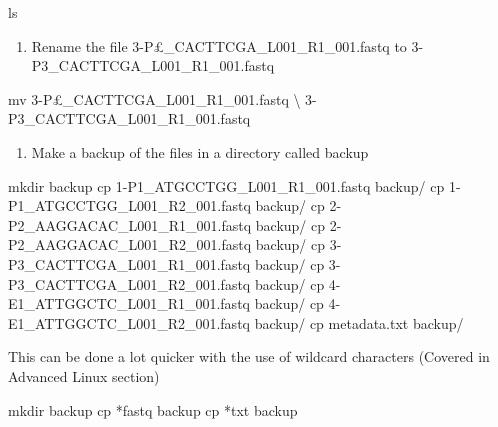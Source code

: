 \documentclass[
  letterpaper,
  DIV=11,
  numbers=noendperiod]{scrreprt}
\newenvironment{Shaded}{\begin{snugshade}}{\end{snugshade}}
\newcommand{\DataTypeTok}[1]{\textcolor[rgb]{0.68,0.00,0.00}{#1}}
\newcommand{\FunctionTok}[1]{\textcolor[rgb]{0.28,0.35,0.67}{#1}}
\newcommand{\NormalTok}[1]{\textcolor[rgb]{0.00,0.23,0.31}{#1}}
\newcommand{\PreprocessorTok}[1]{\textcolor[rgb]{0.68,0.00,0.00}{#1}}
\providecommand{\tightlist}{%
  \setlength{\itemsep}{0pt}\setlength{\parskip}{0pt}}
\begin{document}
\begin{Shaded}
\begin{Highlighting}[]
\FunctionTok{ls}
\end{Highlighting}
\end{Shaded}

\begin{enumerate}
\def\labelenumi{\arabic{enumi}.}
\setcounter{enumi}{1}
\tightlist
\item
  Rename the file 3-P£\_CACTTCGA\_L001\_R1\_001.fastq to
  3-P3\_CACTTCGA\_L001\_R1\_001.fastq
\end{enumerate}

\begin{Shaded}
\begin{Highlighting}[]
\FunctionTok{mv}\NormalTok{ 3{-}P£\_CACTTCGA\_L001\_R1\_001.fastq }\DataTypeTok{\textbackslash{}}
\NormalTok{3{-}P3\_CACTTCGA\_L001\_R1\_001.fastq}
\end{Highlighting}
\end{Shaded}

\begin{enumerate}
\def\labelenumi{\arabic{enumi}.}
\setcounter{enumi}{2}
\tightlist
\item
  Make a backup of the files in a directory called backup
\end{enumerate}

\begin{Shaded}
\begin{Highlighting}[]
\FunctionTok{mkdir}\NormalTok{ backup}
\FunctionTok{cp}\NormalTok{ 1{-}P1\_ATGCCTGG\_L001\_R1\_001.fastq backup/}
\FunctionTok{cp}\NormalTok{ 1{-}P1\_ATGCCTGG\_L001\_R2\_001.fastq backup/}
\FunctionTok{cp}\NormalTok{ 2{-}P2\_AAGGACAC\_L001\_R1\_001.fastq backup/}
\FunctionTok{cp}\NormalTok{ 2{-}P2\_AAGGACAC\_L001\_R2\_001.fastq backup/}
\FunctionTok{cp}\NormalTok{ 3{-}P3\_CACTTCGA\_L001\_R1\_001.fastq backup/}
\FunctionTok{cp}\NormalTok{ 3{-}P3\_CACTTCGA\_L001\_R2\_001.fastq backup/}
\FunctionTok{cp}\NormalTok{ 4{-}E1\_ATTGGCTC\_L001\_R1\_001.fastq backup/}
\FunctionTok{cp}\NormalTok{ 4{-}E1\_ATTGGCTC\_L001\_R2\_001.fastq backup/}
\FunctionTok{cp}\NormalTok{ metadata.txt backup/}
\end{Highlighting}
\end{Shaded}

This can be done a lot quicker with the use of wildcard characters
(Covered in Advanced Linux section)

\begin{Shaded}
\begin{Highlighting}[]
\FunctionTok{mkdir}\NormalTok{ backup}
\FunctionTok{cp} \PreprocessorTok{*}\NormalTok{fastq backup}
\FunctionTok{cp} \PreprocessorTok{*}\NormalTok{txt backup}
\end{Highlighting}
\end{Shaded}
\end{document}
